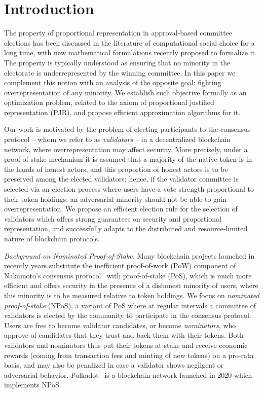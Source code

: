 \section{Introduction}

The property of proportional representation in approval-based committee elections has been discussed in the literature of computational social choice for a long time, with new mathematical formulations recently proposed to formalize it. 
The property is typically understood as ensuring that no minority in the electorate is underrepresented by the winning committee. 
In this paper we complement this notion with an analysis of the opposite goal: fighting overrepresentation of any minority. 
We establish such objective formally as an optimization problem, related to the axiom of proportional justified representation (PJR), and propose efficient approximation algorithms for it. 

Our work is motivated by the problem of electing participants to the consensus protocol -- whom we refer to as \emph{validators} -- in a decentralized blockchain network, where overrepresentation may affect security. 
More precisely, under a proof-of-stake mechanism it is assumed that a majority of the native token is in the hands of honest actors, and this proportion of honest actors is to be preserved among the elected validators; 
hence, if the validator committee is selected via an election process where users have a vote strength proportional to their token holdings, an adversarial minority should not be able to gain overrepresentation. 
We propose an efficient election rule for the selection of validators which offers strong guarantees on security and proportional representation, and successfully adapts to the distributed and resource-limited nature of blockchain protocols.

\emph{Background on Nominated Proof-of-Stake.}
Many blockchain projects launched in recently years substitute the inefficient proof-of-work (PoW) component of Nakamoto's consensus protocol~\cite{nakamoto2019bitcoin} with proof-of-stake (PoS), which is much more efficient and offers security in the presence of a dishonest minority of users, where this minority is to be measured relative to token holdings. 
We focus on \emph{nominated proof-of-stake} (NPoS), a variant of PoS where at regular intervals a committee of validators is elected by the community to participate in the consensus protocol. 
Users are free to become validator candidates, or become \emph{nominators}, who approve of candidates that they trust and back them with their tokens. 
Both validators and nominators thus put their tokens at stake and receive economic rewards (coming from transaction fees and minting of new tokens) on a pro-rata basis, and may also be penalized in case a validator shows negligent or adversarial behavior.
Polkadot~\cite{burdges2020overview} is a blockchain network launched in 2020 which implements NPoS.

